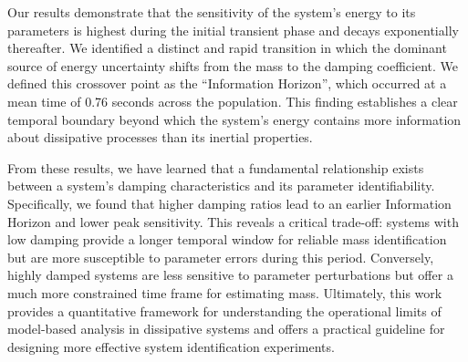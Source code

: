 \documentclass[]{article}
\begin{document}
Our results demonstrate that the sensitivity of the system's energy to its parameters is highest during the initial transient phase and decays exponentially thereafter. We identified a distinct and rapid transition in which the dominant source of energy uncertainty shifts from the mass to the damping coefficient. We defined this crossover point as the ``Information Horizon'', which occurred at a mean time of 0.76 seconds across the population. This finding establishes a clear temporal boundary beyond which the system's energy contains more information about dissipative processes than its inertial properties.

From these results, we have learned that a fundamental relationship exists between a system's damping characteristics and its parameter identifiability. Specifically, we found that higher damping ratios lead to an earlier Information Horizon and lower peak sensitivity. This reveals a critical trade-off: systems with low damping provide a longer temporal window for reliable mass identification but are more susceptible to parameter errors during this period. Conversely, highly damped systems are less sensitive to parameter perturbations but offer a much more constrained time frame for estimating mass. Ultimately, this work provides a quantitative framework for understanding the operational limits of model-based analysis in dissipative systems and offers a practical guideline for designing more effective system identification experiments.


{}

\end{document}
